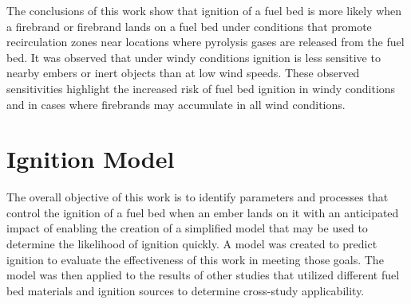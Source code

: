     The conclusions of this work show that ignition of a fuel bed is more likely when a firebrand or firebrand lands on a fuel bed under conditions that promote recirculation zones near locations where pyrolysis gases are released from the fuel bed. It was observed that under windy conditions ignition is less sensitive to nearby embers or inert objects than at low wind speeds. These observed sensitivities highlight the increased risk of fuel bed ignition in windy conditions and in cases where firebrands may accumulate in all wind conditions. 

\section{Ignition Model}
    The overall objective of this work is to identify parameters and processes that control the ignition of a fuel bed when an ember lands on it with an anticipated impact of enabling the creation of a simplified model that may be used to determine the likelihood of ignition quickly. A model was created to predict ignition to evaluate the effectiveness of this work in meeting those goals. The model was then applied to the results of other studies that utilized different fuel bed materials and ignition sources to determine cross-study applicability.
    
